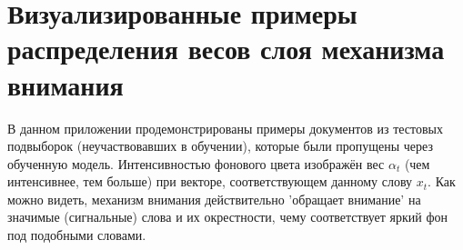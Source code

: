 \chapter{Визуализированные примеры распределения весов слоя механизма внимания} \label{visual}
В данном приложении продемонстрированы примеры документов из тестовых подвыборок (неучаствовавших в обучении), которые были пропущены через обученную модель. Интенсивностью фонового цвета изображён вес $\alpha_{t}$ (чем интенсивнее, тем больше) при векторе, соответствующем данному слову $x_{t}$. Как можно видеть, механизм внимания действительно 'обращает внимание' на значимые (сигнальные) слова и их окрестности, чему соответствует яркий фон под подобными словами.

